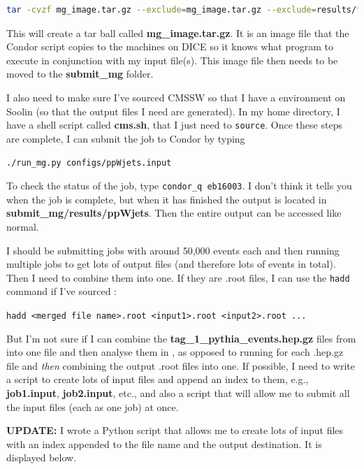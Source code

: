 \begin{lstlisting}[belowskip=-0.7cm, language=sh, numbers=none]
tar -cvzf mg_image.tar.gz --exclude=mg_image.tar.gz --exclude=results/* *
\end{lstlisting}

This will create a tar ball called \textbf{mg\_image.tar.gz}. It is an image file that the Condor script copies to the machines on DICE so it knows what program to execute in conjunction with my input file(s). This image file then needs to be moved to the \textbf{submit\_mg} folder.

I also need to make sure I've sourced CMSSW so that I have a \ROOT environment on Soolin (so that the output files I need are generated). In my home directory, I have a shell script called \textbf{cms.sh}, that I just need to \verb!source!. Once these steps are complete, I can submit the job to Condor by typing

\verb!./run_mg.py configs/ppWjets.input!

To check the status of the job, type \verb!condor_q eb16003!. I don't think it tells you when the job is complete, but when it has finished the output is located in \textbf{submit\_mg/results/ppWjets}. Then the entire \madgraph output can be accessed like normal.

I should be submitting jobs with around 50,000 events each and then running multiple jobs to get lots of output files (and therefore lots of events in total). Then I need to combine them into one. If they are .root files, I can use the \verb!hadd! command if I've sourced \ROOT:

\verb!hadd <merged file name>.root <input1>.root <input2>.root ...!

But I'm not sure if I can combine the \textbf{tag\_1\_pythia\_events.hep.gz} files from \madgraph into one file and then analyse them in \madanalysis, as opposed to running \madanalysis for each .hep.gz file and \emph{then} combining the output .root files into one. If possible, I need to write a script to create lots of input files and append an index to them, e.g., \textbf{job1.input}, \textbf{job2.input}, etc., and also a script that will allow me to submit all the input files (each as one job) at once.

\textbf{UPDATE:} I wrote a Python script that allows me to create lots of input files with an index appended to the file name and the \madgraph output destination. It is displayed below.

 


